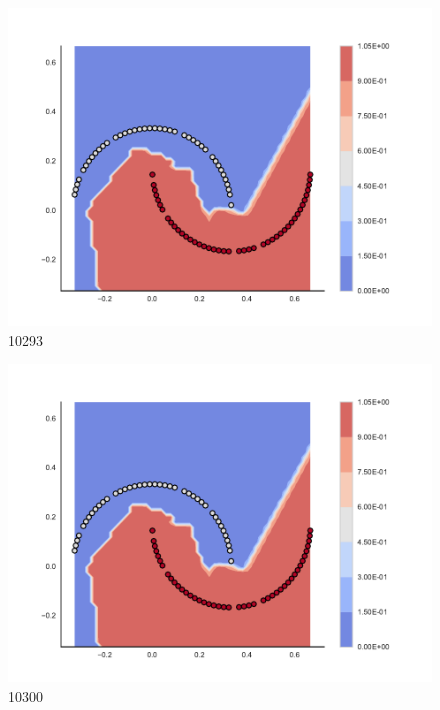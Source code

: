 \begin{subfigure}[b]{0.09\textwidth}
    \includegraphics[clip, trim=2.35cm 1.75cm 4.5cm 0cm,width=\textwidth]{img/convergence/10293.pdf}
    \caption{10293}
    \label{fig:convergence_10293}
\end{subfigure}
%
\begin{subfigure}[b]{0.09\textwidth}
    \includegraphics[clip, trim=2.35cm 1.75cm 4.5cm 0cm,width=\textwidth]{img/convergence/10300.pdf}
    \caption{10300}
    \label{fig:convergence_10300}
\end{subfigure}
%
